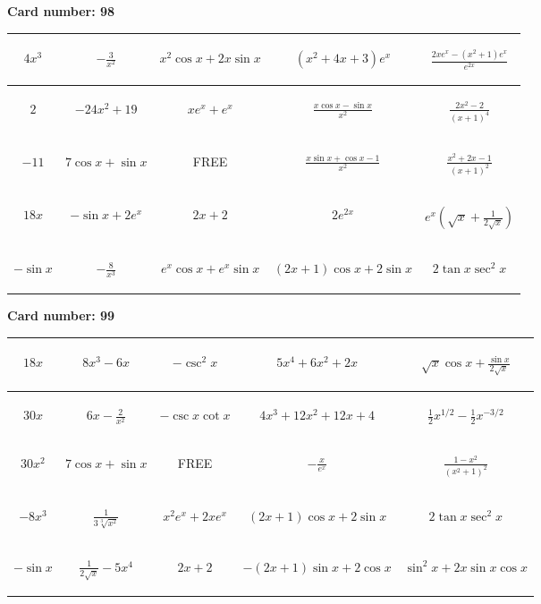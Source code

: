 \documentclass{article}
\newcommand{\entry}[1]{\begin{minipage}[t][2.75cm][t]{4cm} \vspace{1cm} \begin{center}#1\end{center} \end{minipage}}
\newcommand{\freespace}{\entry{FREE}}
\newcommand{\cardnumber}[1]{\noindent \textbf{Card number: #1} \bigskip}
\begin{document}
\pagebreak

\cardnumber{98}
\begin{center}
\begin{tabular}{|*{5}{c|}}
    \hline
    \entry{$4x^3$} & \entry{$-\frac{3}{x^2}$} & \entry{$x^2 \cos x + 2x \sin x$} & \entry{$(x^2 + 4x + 3) e^x$} & \entry{$\frac{2x e^x - (x^2 + 1) e^x}{e^{2x}}$} \\ \hline
    \entry{$2$} & \entry{$-24x^2 + 19$} & \entry{$x e^x + e^x$} & \entry{$\frac{x \cos x - \sin x}{x^2}$} & \entry{$\frac{2x^2 - 2}{(x + 1)^4}$} \\ \hline
    \entry{$-11$} & \entry{$7 \cos x + \sin x$} & \freespace & \entry{$\frac{x \sin x + \cos x - 1}{x^2}$} & \entry{$\frac{x^2 + 2x - 1}{(x + 1)^2}$} \\ \hline
    \entry{$18x$} & \entry{$-\sin x + 2e^x$} & \entry{$2x + 2$} & \entry{$2e^{2x}$} & \entry{$e^x \left(\sqrt{x} + \frac{1}{2\sqrt{x}}\right)$} \\ \hline
    \entry{$-\sin x$} & \entry{$-\frac{8}{x^3}$} & \entry{$e^x \cos x + e^x \sin x$} & \entry{$(2x + 1) \cos x + 2 \sin x$} & \entry{$2 \tan x \sec^2 x$} \\ \hline
\end{tabular}
\end{center}

\pagebreak

\cardnumber{99}
\begin{center}
\begin{tabular}{|*{5}{c|}}
    \hline
    \entry{$18x$} & \entry{$8x^3 - 6x$} & \entry{$-\csc^2 x$} & \entry{$5x^4 + 6x^2 + 2x$} & \entry{$\sqrt{x} \cos x + \frac{\sin x}{2 \sqrt{x}}$} \\ \hline
    \entry{$30x$} & \entry{$6x - \frac{2}{x^2}$} & \entry{$-\csc x \cot x$} & \entry{$4x^3 + 12x^2 + 12x + 4$} & \entry{$\frac{1}{2} x^{1/2} - \frac{1}{2} x^{-3/2}$} \\ \hline
    \entry{$30x^2$} & \entry{$7 \cos x + \sin x$} & \freespace & \entry{$-\frac{x}{e^x}$} & \entry{$\frac{1 - x^2}{(x^2 + 1)^2}$} \\ \hline
    \entry{$-8x^3$} & \entry{$\frac{1}{3\sqrt[3]{x^2}}$} & \entry{$x^2 e^x + 2x e^x$} & \entry{$(2x + 1) \cos x + 2 \sin x$} & \entry{$2 \tan x \sec^2 x$} \\ \hline
    \entry{$-\sin x$} & \entry{$\frac{1}{2\sqrt{x}} - 5x^4$} & \entry{$2x + 2$} & \entry{$-(2x + 1) \sin x + 2 \cos x$} & \entry{$\sin^2 x + 2x \sin x \cos x$} \\ \hline
\end{tabular}
\end{center}
\end{document}
